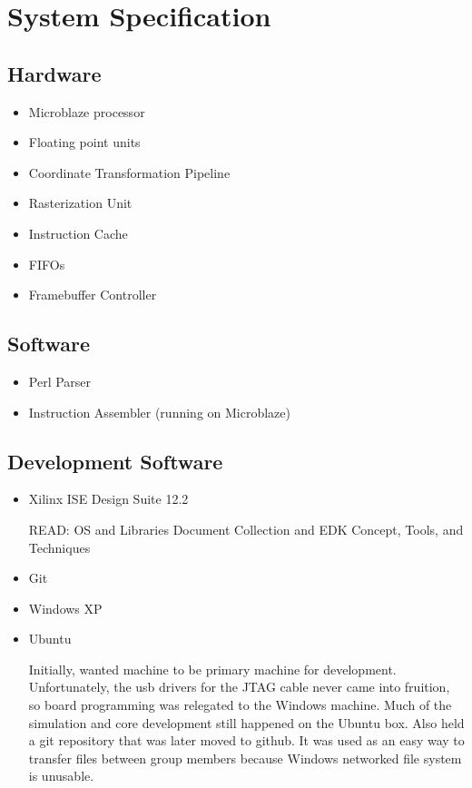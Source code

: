 \documentclass[letterpaper,10pt]{article}
\begin{document}
\section{System Specification}
\subsection{Hardware}
\begin{itemize}

\item Microblaze processor

\item Floating point units

\item Coordinate Transformation Pipeline

\item Rasterization Unit

\item Instruction Cache

\item FIFOs

\item Framebuffer Controller

\end{itemize}

\subsection{Software}
\begin{itemize}

\item Perl Parser

\item Instruction Assembler (running on Microblaze)

\end{itemize}

\subsection{Development Software}
\begin{itemize}

\item Xilinx ISE Design Suite 12.2

READ: OS and Libraries Document Collection and EDK Concept, Tools, and Techniques

\item Git

\item Windows XP

\item Ubuntu

Initially, wanted machine to be primary machine for development.  Unfortunately, the usb drivers for the JTAG cable never came into fruition, so board programming was relegated to the Windows machine.  Much of the simulation and core development still happened on the Ubuntu box.  Also held a git repository that was later moved to github.  It was used as an easy way to transfer files between group members because Windows networked file system is unusable.  

\end{itemize}
\end{document}
